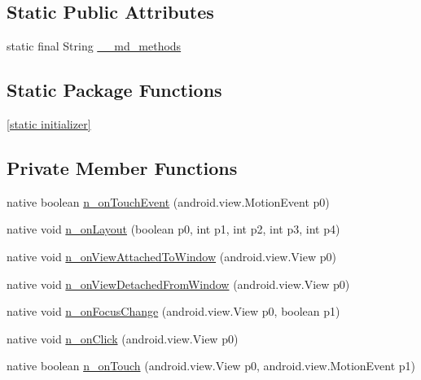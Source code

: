 \subsection*{Static Public Attributes}
\begin{CompactItemize}
\item 
static final String \hyperlink{classmd57018357d52b54713cd814fbd5262dd1f_1_1_button_renderer_07d67ace7550d930955ba79206673c60}{\_\-\_\-md\_\-methods}
\end{CompactItemize}
\subsection*{Static Package Functions}
\begin{CompactItemize}
\item 
\hyperlink{classmd57018357d52b54713cd814fbd5262dd1f_1_1_button_renderer_0849ae44a116078b51fce5fadbd7f4b7}{\mbox{[}static initializer\mbox{]}}
\end{CompactItemize}
\subsection*{Private Member Functions}
\begin{CompactItemize}
\item 
native boolean \hyperlink{classmd57018357d52b54713cd814fbd5262dd1f_1_1_button_renderer_3cb39749501d7b1e24a4e414d3eedcfd}{n\_\-onTouchEvent} (android.view.MotionEvent p0)
\item 
native void \hyperlink{classmd57018357d52b54713cd814fbd5262dd1f_1_1_button_renderer_b9f917e4f7827eafdb2630fe8dbf09ab}{n\_\-onLayout} (boolean p0, int p1, int p2, int p3, int p4)
\item 
native void \hyperlink{classmd57018357d52b54713cd814fbd5262dd1f_1_1_button_renderer_48f8e843fa3c1bb9a90cd884d614ce2a}{n\_\-onViewAttachedToWindow} (android.view.View p0)
\item 
native void \hyperlink{classmd57018357d52b54713cd814fbd5262dd1f_1_1_button_renderer_4a6b7e452049dfdcd953991b67111f7f}{n\_\-onViewDetachedFromWindow} (android.view.View p0)
\item 
native void \hyperlink{classmd57018357d52b54713cd814fbd5262dd1f_1_1_button_renderer_cafdc35bd214953c92f41b73511cf15b}{n\_\-onFocusChange} (android.view.View p0, boolean p1)
\item 
native void \hyperlink{classmd57018357d52b54713cd814fbd5262dd1f_1_1_button_renderer_444e04ce6573dd09967b25af7df43b31}{n\_\-onClick} (android.view.View p0)
\item 
native boolean \hyperlink{classmd57018357d52b54713cd814fbd5262dd1f_1_1_button_renderer_f3e5d1d8c20e5cb8535eab5444718717}{n\_\-onTouch} (android.view.View p0, android.view.MotionEvent p1)
\end{CompactItemize}
